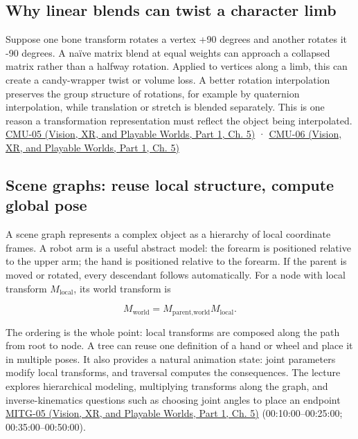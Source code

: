 \subsection{Why linear blends can twist a character limb}\label{04-visual-computing-ii-ch029-why-linear-blends-can-twist-a-character-limb}

\hypertarget{04-visual-computing-ii-ch029-why-linear-blends-can-twist-a-character-limb}{}

Suppose one bone transform rotates a vertex +90 degrees and another rotates it -90 degrees. A naïve matrix blend at equal weights can approach a collapsed matrix rather than a halfway rotation. Applied to vertices along a limb, this can create a candy-wrapper twist or volume loss. A better rotation interpolation preserves the group structure of rotations, for example by quaternion interpolation, while translation or stretch is blended separately. This is one reason a transformation representation must reflect the object being interpolated. \href{../07-Vision-XR-and-Playable-Worlds-P01/main.pdf\#nameddest=04-visual-computing-ii-ch036-cmu-05---spatial-transformations}{CMU-05 (Vision, XR, and Playable Worlds, Part 1, Ch. 5)} · \href{../07-Vision-XR-and-Playable-Worlds-P01/main.pdf\#nameddest=04-visual-computing-ii-ch036-cmu-06---3d-rotations-and-complex-representations}{CMU-06 (Vision, XR, and Playable Worlds, Part 1, Ch. 5)}

\subsection{Scene graphs: reuse local structure, compute global pose}\label{04-visual-computing-ii-ch029-scene-graphs-reuse-local-structure-compute-global-pose}

\hypertarget{04-visual-computing-ii-ch029-scene-graphs-reuse-local-structure-compute-global-pose}{}

A scene graph represents a complex object as a hierarchy of local coordinate frames. A robot arm is a useful abstract model: the forearm is positioned relative to the upper arm; the hand is positioned relative to the forearm. If the parent is moved or rotated, every descendant follows automatically. For a node with local transform \(M_{\mathrm{local}}\), its world transform is

\[
M_{\text{world}}=M_{\text{parent,world}}M_{\text{local}}.
\]

The ordering is the whole point: local transforms are composed along the path from root to node. A tree can reuse one definition of a hand or wheel and place it in multiple poses. It also provides a natural animation state: joint parameters modify local transforms, and traversal computes the consequences. The lecture explores hierarchical modeling, multiplying transforms along the graph, and inverse-kinematics questions such as choosing joint angles to place an endpoint \href{../07-Vision-XR-and-Playable-Worlds-P01/main.pdf\#nameddest=04-visual-computing-ii-ch036-mitg-05---hierarchical-modeling}{MITG-05 (Vision, XR, and Playable Worlds, Part 1, Ch. 5)} (00:10:00--00:25:00; 00:35:00--00:50:00).

